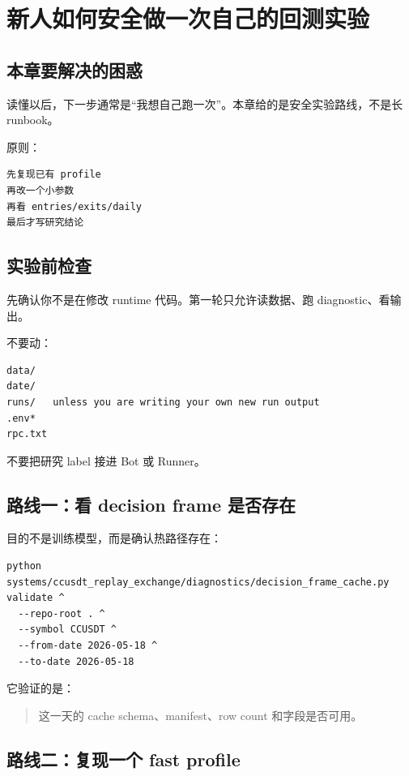 \chapter{新人如何安全做一次自己的回测实验}

\section{本章要解决的困惑}

读懂以后，下一步通常是“我想自己跑一次”。本章给的是安全实验路线，不是长 runbook。

原则：

\begin{lstlisting}
先复现已有 profile
再改一个小参数
再看 entries/exits/daily
最后才写研究结论
\end{lstlisting}

\section{实验前检查}

先确认你不是在修改 runtime 代码。第一轮只允许读数据、跑 diagnostic、看输出。

不要动：

\begin{lstlisting}
data/
date/
runs/   unless you are writing your own new run output
.env*
rpc.txt
\end{lstlisting}

不要把研究 label 接进 Bot 或 Runner。

\section{路线一：看 decision frame 是否存在}

目的不是训练模型，而是确认热路径存在：

\begin{lstlisting}
python systems/ccusdt_replay_exchange/diagnostics/decision_frame_cache.py validate ^
  --repo-root . ^
  --symbol CCUSDT ^
  --from-date 2026-05-18 ^
  --to-date 2026-05-18
\end{lstlisting}

它验证的是：

\begin{quote}
这一天的  cache schema、manifest、row count 和字段是否可用。
\end{quote}

\section{路线二：复现一个 fast profile}

